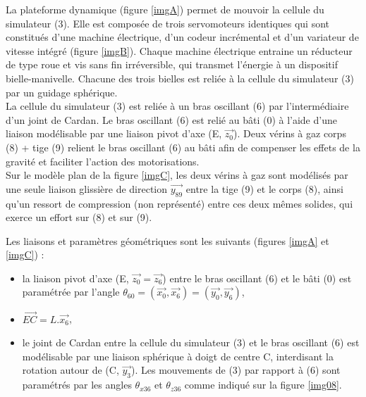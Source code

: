 La plateforme dynamique (figure \ref{imgA}) permet de mouvoir la cellule du simulateur (3). Elle est composée de trois servomoteurs identiques qui sont constitués d'une machine électrique, d'un codeur incrémental et d'un variateur de vitesse intégré (figure \ref{imgB}).
Chaque machine électrique entraine un réducteur de type roue et vis sans fin irréversible, qui transmet l'énergie à un dispositif bielle-manivelle. Chacune des trois bielles est reliée à la cellule du simulateur (3) par un guidage sphérique. \\
La cellule du simulateur (3) est reliée à un bras oscillant (6) par l'intermédiaire d'un joint de Cardan. Le bras oscillant (6) est relié au bâti (0) à l'aide d'une liaison modélisable par une liaison pivot d'axe (E, $\overrightarrow{z_0}$). Deux vérins à gaz {corps (8) + tige (9)} relient le bras oscillant (6) au bâti afin de compenser les effets de la gravité et faciliter l'action des motorisations.\\
Sur le modèle plan de la figure \ref{imgC}, les deux vérins à gaz sont modélisés par une seule liaison glissière de direction $\overrightarrow{y_{89}}$ entre la tige (9) et le corps (8), ainsi qu'un ressort de compression (non représenté) entre ces deux mêmes solides, qui exerce un effort sur (8) et sur (9).

Les liaisons et paramètres géométriques sont les suivants (figures \ref{imgA} et \ref{imgC}) :
\begin{itemize}
 \item la liaison pivot d'axe (E, $\overrightarrow{z_0}=\overrightarrow{z_6}$) entre le bras oscillant (6) et le bâti (0) est paramétrée par l'angle $\theta_{60}=(\overrightarrow{x_0},\overrightarrow{x_6})=(\overrightarrow{y_0},\overrightarrow{y_6})$,
 \item $\overrightarrow{EC}=L.\overrightarrow{x_6}$,
 \item le joint de Cardan entre la cellule du simulateur (3) et le bras oscillant (6) est modélisable par une liaison sphérique à doigt de centre C, interdisant la rotation autour de (C, $\overrightarrow{y_3}$). Les mouvements de (3) par rapport à (6) sont paramétrés par les angles $\theta_{x36}$ et $\theta_{z36}$ comme indiqué sur la figure \ref{img08}.
\end{itemize}

